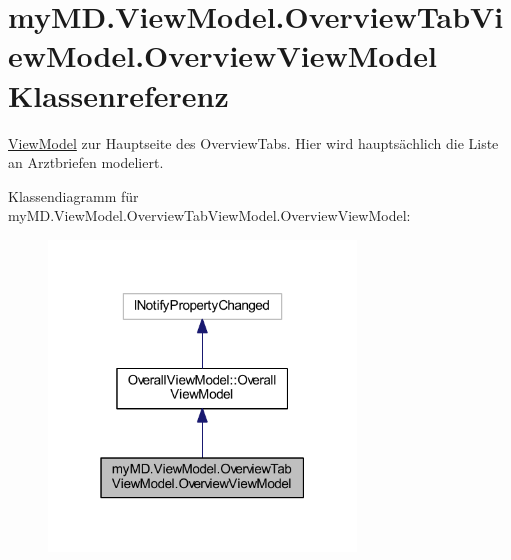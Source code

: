 \hypertarget{classmy_m_d_1_1_view_model_1_1_overview_tab_view_model_1_1_overview_view_model}{}\section{my\+M\+D.\+View\+Model.\+Overview\+Tab\+View\+Model.\+Overview\+View\+Model Klassenreferenz}
\label{classmy_m_d_1_1_view_model_1_1_overview_tab_view_model_1_1_overview_view_model}


\mbox{\hyperlink{namespacemy_m_d_1_1_view_model}{View\+Model}} zur Hauptseite des Overview\+Tabs. Hier wird hauptsächlich die Liste an Arztbriefen modeliert.  




Klassendiagramm für my\+M\+D.\+View\+Model.\+Overview\+Tab\+View\+Model.\+Overview\+View\+Model\+:
\nopagebreak
\begin{figure}[H]
\begin{center}
\leavevmode
\includegraphics[width=232pt]{classmy_m_d_1_1_view_model_1_1_overview_tab_view_model_1_1_overview_view_model__inherit__graph}
\end{center}
\end{figure}


